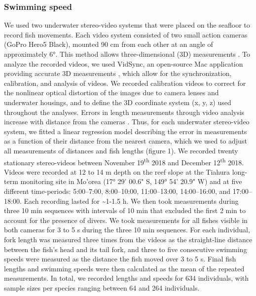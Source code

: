 \documentclass[
]{article}
\begin{document}
\hypertarget{swimming-speed}{%
\subsubsection{Swimming speed}\label{swimming-speed}}

We used two underwater stereo-video systems that were placed on the
seafloor to record fish movements. Each video system consisted of two
small action cameras (GoPro Hero5 Black), mounted 90 cm from each other
at an angle of approximately 6°. This method allows three-dimensional
(3D) measurements \citep{Butail2012, Hughes1996}. To analyze the
recorded videos, we used VidSync, an open-source Mac application
providing accurate 3D measurements \citep{Neuswanger2016}, which allow
for the synchronization, calibration, and analysis of videos. We
recorded calibration videos to correct for the nonlinear optical
distortion of the images due to camera lenses and underwater housings,
and to define the 3D coordinate system (x, y, z) used throughout the
analyses. Errors in length measurements through video analysis increase
with distance from the cameras \citep{Neuswanger2016}. Thus, for each
underwater stereo-video system, we fitted a linear regression model
describing the error in measurements as a function of their distance
from the nearest camera, which we used to adjust all measurements of
distances and fish lengths (figure 1). We recorded twenty stationary
stereo-videos between November 19\textsuperscript{th} 2018 and December
12\textsuperscript{th} 2018. Videos were recorded at 12 to 14 m depth on
the reef slope at the Tiahura long-term monitoring site in Mo'orea (17°
29' 00.6" S, 149° 54' 20.9" W) and at five different time-periods:
5:00--7:00, 8:00--10:00, 11:00--13:00, 14:00--16:00, and 17:00--18:00.
Each recording lasted for \textasciitilde1-1.5 h. We then took
measurements during three 10 min sequences with intervals of 10 min that
excluded the first 2 min to account for the presence of divers. We took
measurements for all fishes visible in both cameras for 3 to 5 s during
the three 10 min sequences. For each individual, fork length was
measured three times from the videos as the straight-line distance
between the fish's head and its tail fork, and three to five consecutive
swimming speeds were measured as the distance the fish moved over 3 to 5
s. Final fish lengths and swimming speeds were then calculated as the
mean of the repeated measurements. In total, we recorded lengths and
speeds for 634 individuals, with sample sizes per species ranging
between 64 and 264 individuals.
\end{document}
